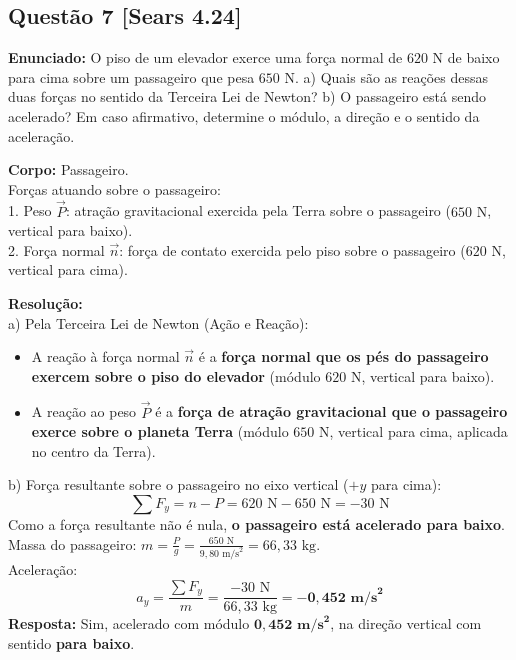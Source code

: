 \documentclass[11pt,a4paper]{article}
\begin{document}
\vspace{0.3cm}
\subsection*{Questão 7 [Sears 4.24]}
\textbf{Enunciado:} O piso de um elevador exerce uma força normal de $620\text{ N}$ de baixo para cima sobre um passageiro que pesa $650\text{ N}$. a) Quais são as reações dessas duas forças no sentido da Terceira Lei de Newton? b) O passageiro está sendo acelerado? Em caso afirmativo, determine o módulo, a direção e o sentido da aceleração.

\begin{dclbox}
\textbf{Corpo:} Passageiro.\\
Forças atuando sobre o passageiro:\\
1. Peso $\vec{P}$: atração gravitacional exercida pela Terra sobre o passageiro ($650\text{ N}$, vertical para baixo).\\
2. Força normal $\vec{n}$: força de contato exercida pelo piso sobre o passageiro ($620\text{ N}$, vertical para cima).
\end{dclbox}

\noindent
\textbf{Resolução:}\\
a) Pela Terceira Lei de Newton (Ação e Reação):
\begin{itemize}
    \item A reação à força normal $\vec{n}$ é a \textbf{força normal que os pés do passageiro exercem sobre o piso do elevador} (módulo $620\text{ N}$, vertical para baixo).
    \item A reação ao peso $\vec{P}$ é a \textbf{força de atração gravitacional que o passageiro exerce sobre o planeta Terra} (módulo $650\text{ N}$, vertical para cima, aplicada no centro da Terra).
\end{itemize}
b) Força resultante sobre o passageiro no eixo vertical ($+y$ para cima):
\[ \sum F_y = n - P = 620\text{ N} - 650\text{ N} = -30\text{ N} \]
Como a força resultante não é nula, \textbf{o passageiro está acelerado para baixo}.\\
Massa do passageiro: $m = \frac{P}{g} = \frac{650\text{ N}}{9,80\text{ m/s}^2} = 66,33\text{ kg}$.\\
Aceleração:
\[ a_y = \frac{\sum F_y}{m} = \frac{-30\text{ N}}{66,33\text{ kg}} = \mathbf{-0,452\text{ m/s}^2} \]
\textbf{Resposta:} Sim, acelerado com módulo $\mathbf{0,452\text{ m/s}^2}$, na direção vertical com sentido \textbf{para baixo}.
\end{document}
